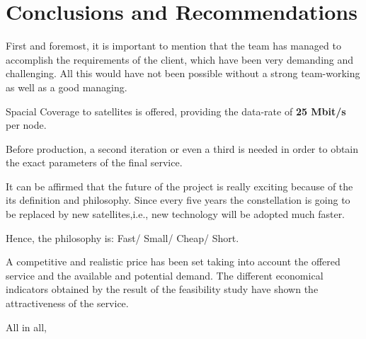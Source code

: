 \chapter{Conclusions and Recommendations}

First and foremost, it is important to mention that the team has managed to accomplish the requirements of the client, which have been very demanding and challenging. All this would have not been possible without a strong team-working as well as a good managing.

Spacial Coverage to satellites is offered, providing the data-rate of \textbf{25 Mbit/s} per node. 

Before production, a second iteration or even a third is needed in order to obtain the exact parameters of the final service.

It can be affirmed that the future of the project is really exciting because of the its definition and philosophy. Since every five years the constellation is going to be replaced by new satellites,i.e., new technology will be adopted much faster.

Hence, the philosophy is: Fast/ Small/ Cheap/ Short.


A competitive and realistic price has been set taking into account the offered service and the available and potential demand. The different economical indicators obtained by the result of the feasibility study have shown the attractiveness of the service.

All in all, 

